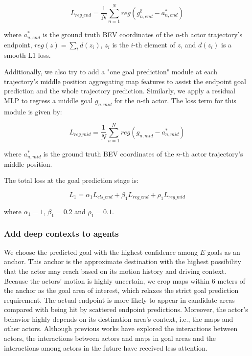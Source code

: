 \begin{equation}
	L_{reg\_end}=\frac{1}{N}\sum_{n=1}^N{reg(g_{n,end}^{\hat{e}}-a^{*}_{n,end})}
\end{equation}

where $a^{*}_{n,end}$ is the ground truth BEV coordinates of the $n$-th actor trajectory's endpoint, $reg(z) = \sum_id(z_i)$, $z_i$ is the $i$-th element of $z$, and $d(z_i)$ is a smooth L1 loss.

Additionally, we also try to add a "one goal prediction" module at each trajectory's middle position aggregating map features to assist the endpoint goal prediction and the whole trajectory prediction.
Similarly, we apply a residual MLP to regress a middle goal $g_{n,mid}$ for the $n$-th actor. 
The loss term for this module is given by:

\begin{equation}
	L_{reg\_mid} = \frac{1}{N}\sum_{n=1}^N {reg(g_{n,mid}-a^*_{n,mid})}
\end{equation}

where $a^*_{n,mid}$ is the ground truth BEV coordinates of the $n$-th actor trajectory's middle position.

The total loss at the goal prediction stage is:

\begin{equation}
	L_{1} = \alpha_1 L_{cls\_end} + \beta_1 L_{reg\_end} +\rho_1 L_{reg\_mid}
\end{equation}

where $\alpha_1 = 1$, $\beta_1 = 0.2$ and $\rho_1 = 0.1$.

\subsubsection{Add deep contexts to agents}
\label{subsubsec:7_improving_efficiency_add_deep_context}

We choose the predicted goal with the highest confidence among $E$ goals as an anchor. This anchor is the approximate destination with the highest possibility that the actor may reach based on its motion history and driving context.
Because the actors' motion is highly uncertain, we crop maps within 6 meters of the anchor as the goal area of interest, which relaxes the strict goal prediction requirement. The actual endpoint is more likely to appear in candidate areas compared with being hit by scattered endpoint predictions.
Moreover, the actor's behavior highly depends on its destination area's context, i.e., the maps and other actors. Although previous works have explored the interactions between actors, the interactions between actors and maps in goal areas and the interactions among actors in the future have received less attention. 

